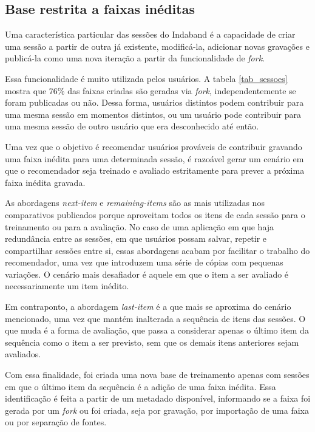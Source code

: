 \subsection{Base restrita a faixas inéditas} 

Uma característica particular das sessões do Indaband é a capacidade de criar
uma sessão a partir de outra já existente, modificá-la, adicionar novas
gravações e publicá-la como uma nova iteração a partir da funcionalidade de
\textit{fork}.

Essa funcionalidade é muito utilizada pelos usuários. A tabela \ref{tab_sessoes}
mostra que 76\% das faixas criadas são geradas via \textit{fork},
independentemente se foram publicadas ou não. Dessa forma, usuários distintos
podem contribuir para uma mesma sessão em momentos distintos, ou um usuário pode
contribuir para uma mesma sessão de outro usuário que era desconhecido até
então.

Uma vez que o objetivo é recomendar usuários prováveis de contribuir gravando
uma faixa inédita para uma determinada sessão, é razoável gerar um cenário em
que o recomendador seja treinado e avaliado estritamente para prever a próxima
faixa inédita gravada.

As abordagens \textit{next-item} e \textit{remaining-items} são as mais
utilizadas nos comparativos publicados porque aproveitam todos os itens de cada
sessão para o treinamento ou para a avaliação. No caso de uma aplicação em que
haja redundância entre as sessões, em que usuários possam salvar, repetir e
compartilhar sessões entre si, essas abordagens acabam por facilitar o trabalho
do recomendador, uma vez que introduzem uma série de cópias com pequenas
variações. O cenário mais desafiador é aquele em que o item a ser avaliado
é necessariamente um item inédito.

Em contraponto, a abordagem \textit{last-item} é a que mais se aproxima do
cenário mencionado, uma vez que mantém inalterada a sequência de itens das
sessões. O que muda é a forma de avaliação, que passa a considerar apenas o
último item da sequência como o item a ser previsto, sem que os demais itens
anteriores sejam avaliados.

Com essa finalidade, foi criada uma nova base de treinamento apenas com sessões
em que o último item da sequência é a adição de uma faixa inédita. Essa
identificação é feita a partir de um metadado disponível, informando se a faixa
foi gerada por um \textit{fork} ou foi criada, seja por gravação, por importação
de uma faixa ou por separação de fontes.


